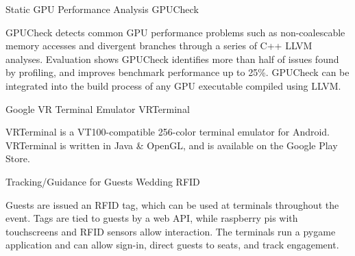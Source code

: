 
\begin{cventries}
    \cventry
        {Static GPU Performance Analysis} %
        {GPUCheck} %
        {} %
        {} %
        {
            \parbox[t]{8.5cm}{GPUCheck detects common GPU performance problems such as non-coalescable memory accesses and divergent branches through a series of C++ LLVM analyses.
            Evaluation shows GPUCheck identifies more than half of issues found by profiling, and improves benchmark performance up to 25\%.
            GPUCheck can be integrated into the build process of any GPU executable compiled using LLVM.
        }}
    \vspace{4mm}
    \cventry
        {Google VR Terminal Emulator} %
        {VRTerminal} %
        {} %
        {} %
        {\parbox[t]{8.5cm}{
            VRTerminal is a VT100-compatible 256-color terminal emulator for Android.
            VRTerminal is written in Java \& OpenGL, and is available on the Google Play Store.
        }}
    \vspace{4mm}
    \cventry
        {Tracking/Guidance for Guests} %
        {Wedding RFID} %
        {} %
        {} %
        {\parbox[t]{8.5cm}{
            Guests are issued an RFID tag, which can be used at terminals throughout the event.
            Tags are tied to guests by a web API, while raspberry pis with touchscreens and RFID sensors allow interaction.
            The terminals run a pygame application and can allow sign-in, direct guests to seats, and track engagement.
        }}
\end{cventries}
